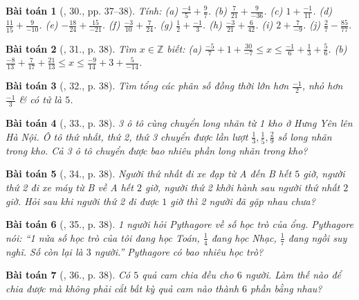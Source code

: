 \documentclass{article}
\newtheorem{baitoan}{Bài toán}
\begin{document}
\begin{baitoan}[\cite{SBT_Toan_6_Canh_Dieu_tap_2}, 30., pp. 37--38]
	Tính: (a) $\frac{-4}{5} + \frac{9}{7}$. (b) $\frac{7}{21} + \frac{9}{-36}$. (c) $1 + \frac{-1}{11}$. (d) $\frac{11}{15} + \frac{9}{-10}$. (e) $-\frac{18}{24} + \frac{15}{-21}$. (f) $\frac{-3}{10} + \frac{7}{24}$. (g) $\frac{1}{2} + \frac{-1}{3}$. (h) $\frac{-3}{21} + \frac{6}{42}$. (i) $2 + \frac{7}{-9}$. (j) $\frac{2}{7} - \frac{85}{77}$.
\end{baitoan}

\begin{baitoan}[\cite{SBT_Toan_6_Canh_Dieu_tap_2}, 31., p. 38]
	Tìm $x\in\mathbb{Z}$ biết: (a) $\frac{-5}{7} + 1 + \frac{30}{-7}\le x\le\frac{-1}{6} + \frac{1}{3} + \frac{5}{6}$. (b) $\frac{-8}{13} + \frac{7}{17} + \frac{21}{13}\le x\le\frac{-9}{14} + 3 + \frac{5}{-14}$.
\end{baitoan}

\begin{baitoan}[\cite{SBT_Toan_6_Canh_Dieu_tap_2}, 32., p. 38]
	Tìm tổng các phân số đồng thời lớn hơn $\frac{-1}{2}$, nhỏ hơn $\frac{-1}{3}$ \& có tử là $5$.
\end{baitoan}

\begin{baitoan}[\cite{SBT_Toan_6_Canh_Dieu_tap_2}, 33., p. 38]
	3 ô tô cùng chuyển long nhãn từ 1 kho ở Hưng Yên lên Hà Nội. Ô tô thứ nhất, thứ 2, thứ 3 chuyển được lần lượt $\frac{1}{3},\frac{1}{5},\frac{2}{9}$ số long nhãn trong kho. Cả 3 ô tô chuyển được bao nhiêu phần long nhãn trong kho?
\end{baitoan}

\begin{baitoan}[\cite{SBT_Toan_6_Canh_Dieu_tap_2}, 34., p. 38]
	Người thứ nhất đi xe đạp từ A đến B hết $5$ giờ, người thứ 2 đi xe máy từ B về A hết $2$ giờ, người thứ 2 khởi hành sau người thứ nhất $2$ giờ. Hỏi sau khi người thứ 2 đi được $1$ giờ thì 2 người đã gặp nhau chưa?
\end{baitoan}

\begin{baitoan}[\cite{SBT_Toan_6_Canh_Dieu_tap_2}, 35., p. 38]
	1 người hỏi Pythagore về số học trò của ổng. Pythagore nói: ``1 nửa số học trò của tôi đang học Toán, $\frac{1}{4}$ đang học Nhạc, $\frac{1}{7}$ đang ngồi suy nghĩ. Số còn lại là $3$ người.'' Pythagore có bao nhiêu học trò?
\end{baitoan}

\begin{baitoan}[\cite{SBT_Toan_6_Canh_Dieu_tap_2}, 36., p. 38]
	Có $5$ quả cam chia đều cho $6$ người. Làm thế nào để chia được mà không phải cắt bất kỳ quả cam nào thành $6$ phần bằng nhau?
\end{baitoan}
\end{document}

